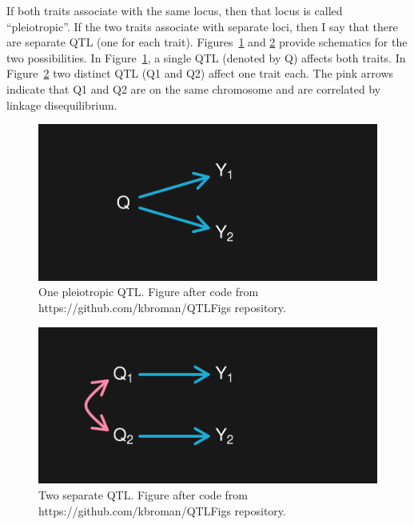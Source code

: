 \documentclass[oneside]{book}\usepackage[]{graphicx}\usepackage[]{color}
\newenvironment{knitrout}{}{} %
\begin{document}
If both traits associate with the same locus, then that locus is called ``pleiotropic''.
If the two traits associate with separate loci, then I say that
there are separate QTL (one for each trait). Figures~\ref{fig:pleiotropy-2traits}
and \ref{fig:separate-2traits} provide schematics for the two possibilities.
In Figure~\ref{fig:pleiotropy-2traits}, a single QTL (denoted by Q) affects both traits.
In Figure~\ref{fig:separate-2traits} two distinct QTL (Q1 and Q2) affect one trait each. The pink arrows indicate that Q1 and Q2 are on the same chromosome and are correlated by linkage disequilibrium.

\begin{knitrout}
\color{fgcolor}\begin{figure}
\includegraphics[width=\textwidth]{figure/pleiotropy-2traits-1} \caption[One pleiotropic QTL]{One pleiotropic QTL. Figure after code from https://github.com/kbroman/QTLFigs repository.}\label{fig:pleiotropy-2traits}
\end{figure}


\end{knitrout}



\begin{knitrout}
\color{fgcolor}\begin{figure}
\includegraphics[width=\textwidth]{figure/separate-2traits-1} \caption[Two separate QTL]{Two separate QTL. Figure after code from https://github.com/kbroman/QTLFigs repository.}\label{fig:separate-2traits}
\end{figure}


\end{knitrout}
\end{document}
